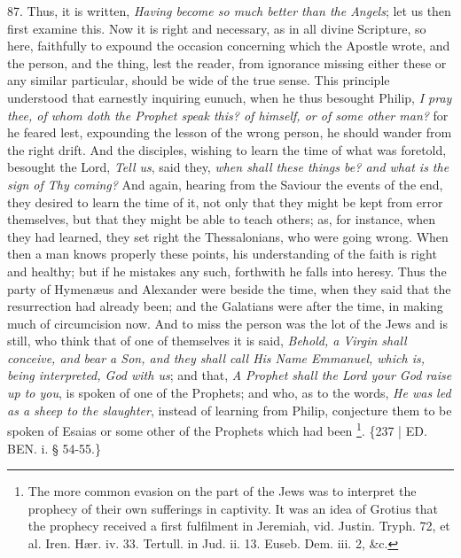 87. Thus, it is written, \emph{Having
become so much better than the Angels}; let us then first examine
this. Now it is right and necessary, as in all divine Scripture, so
here, faithfully to expound the occasion concerning which the Apostle
wrote, and the person, and the thing, lest the reader, from ignorance missing either these or any similar particular, should be
wide of the true sense. This principle understood that earnestly
inquiring eunuch, when he thus besought Philip, \emph{I pray thee, of
whom doth the Prophet speak this? of himself, or of some other man?}
for he feared lest, expounding the lesson of the wrong person, he
should wander from the right drift. And the disciples, wishing to
learn the time of what was foretold, besought the Lord, \emph{Tell us},
said they, \emph{when shall these things be? and what is the sign of Thy
coming?} And again, hearing from the Saviour the events of the end,
they desired to learn the time of it, not only that they might be kept
from error themselves, but that they might be able to teach others;
as, for instance, when they had learned, they set right the
Thessalonians, who were going wrong. When then a man knows properly
these points, his understanding of the faith is right and healthy; but
if he mistakes any such, forthwith he falls into heresy. Thus the
party of Hymenæus and Alexander were beside the time, when they said
that the resurrection had already been; and the Galatians were after
the time, in making much of circumcision now. And to miss the person
was the lot of the Jews and is still, who think that of one of
themselves it is said, \emph{Behold, a Virgin shall conceive, and bear a
Son, and they shall call His Name Emmanuel, which is, being
interpreted, God with us}; and that, \emph{A Prophet shall the Lord
your God raise up to you}, is spoken of one of the Prophets; and
who, as to the words, \emph{He was led as a sheep to the slaughter},
instead of learning from Philip, conjecture them to be spoken of
Esaias or some other of the Prophets which had been \footnote{The more common evasion on the part of the Jews was to interpret the
prophecy of their own sufferings in captivity. It was an idea of
Grotius that the prophecy received a first fulfilment in Jeremiah, vid.
Justin. Tryph. 72, et al. Iren. Hær. iv. 33. Tertull. in Jud. ii. 13.
Euseb. Dem. iii. 2, \&c.}. \{237 | ED. BEN.
i. § 54-55.\}

